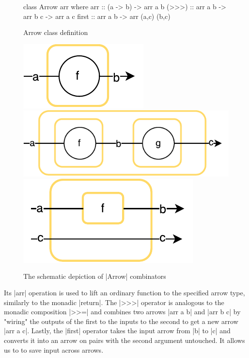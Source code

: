 \begin{figure}[h]
\centering
\parbox[c][16.5em]{0.49\linewidth}{%
\begin{center}
\vfill
\begin{code}
class Arrow arr where
  arr :: (a -> b) -> arr a b
  (>>>) :: arr a b -> arr b c -> arr a c
  first :: arr a b -> arr (a,c) (b,c)
\end{code}
\vfill
\end{center}
\caption{Arrow class definition}
\label{fig:ArrowDefinition}
}
\parbox[c][16.5em]{0.49\linewidth}{%
\vfill
\centering
	{\includegraphics[scale=0.6]{images/arr}}
	{\includegraphics[scale=0.6]{images/compose}}
	{\includegraphics[scale=0.6]{images/first}}
\vfill
\caption{The schematic depiction of |Arrow| combinators}
}
\end{figure}
Its |arr| operation is used to lift an ordinary function to the specified arrow type, similarly to the monadic |return|. The |>>>| operator is analogous to the monadic composition  |>>=| and combines two arrows |arr a b| and |arr b c| by "wiring" the outputs of the first to the inputs to the second to get a new arrow |arr a c|. Lastly, the |first| operator  takes the input arrow from |b| to |c| and converts it into an arrow on pairs with the second argument untouched. It allows us to to save input across arrows.
